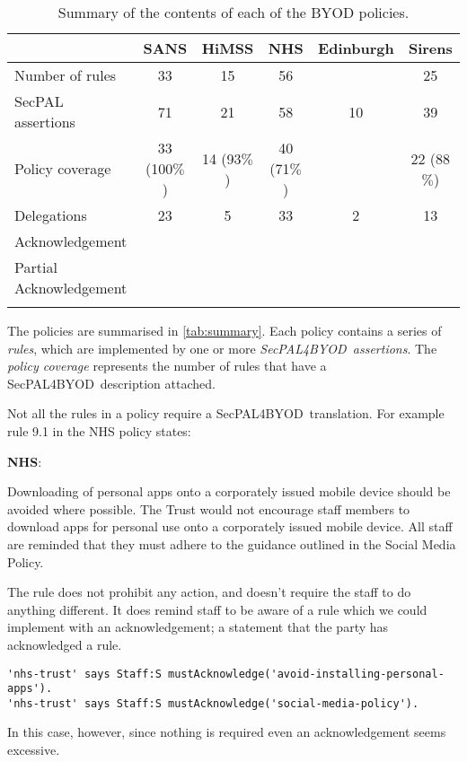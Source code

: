 \documentclass{llncs}
\newcommand{\AppPAL}[0]{SecPAL4BYOD}
\newenvironment{policyrule}[1]{%
  \begin{mdframed}\footnotesize
      \noindent\textbf{\sffamily #1}:~\itshape%
}{%
  \end{mdframed}
}
\begin{document}
\begin{table}\centering\footnotesize\sffamily
  \begin{tabular}{l c c c c c}
    \toprule
                             & {SANS}       & {HiMSS}     & {NHS}       & {Edinburgh} & {Sirens}    \\
    \midrule
    Number of rules          & 33           & 15          & 56          &             & 25          \\
    SecPAL assertions        & 71           & 21          & 58          & 10          & 39          \\
    Policy coverage          & 33 (100$\%$) & 14 (93$\%$) & 40 (71$\%$) &             & 22 (88$\%$) \\
    \midrule
    Delegations              & 23           & 5           & 33          & 2           & 13          \\
    Acknowledgement          &              &             &             &             &             \\
    Partial Acknowledgement  &              &             &             &             &             \\
    \bottomrule             \\
  \end{tabular}
  \label{tab:summary}
  \caption{Summary of the contents of each of the BYOD policies.}
\end{table}

The policies are summarised in \autoref{tab:summary}.
Each policy contains a series of \emph{rules}, which are implemented by one or more \emph{\AppPAL~assertions}.
The \emph{policy coverage} represents the number of rules that have a \AppPAL~description attached.

Not all the rules in a policy require a \AppPAL~translation.
For example rule 9.1 in the NHS policy states:
\begin{policyrule}{NHS}
  Downloading of personal apps onto a corporately issued mobile device should be avoided where possible.
  The Trust would not encourage staff members to download apps for personal use onto a corporately issued mobile device.
  All staff are reminded that they must adhere to the guidance outlined in the Social Media Policy.
\end{policyrule}
The rule does not prohibit any action, and doesn't require the staff to do anything different.
It does remind staff to be aware of a rule which we could implement with an acknowledgement; a statement that the party has acknowledged a rule.
\begin{lstlisting}
'nhs-trust' says Staff:S mustAcknowledge('avoid-installing-personal-apps').
'nhs-trust' says Staff:S mustAcknowledge('social-media-policy').
\end{lstlisting}
In this case, however, since nothing is required even an acknowledgement seems excessive.
\end{document}
